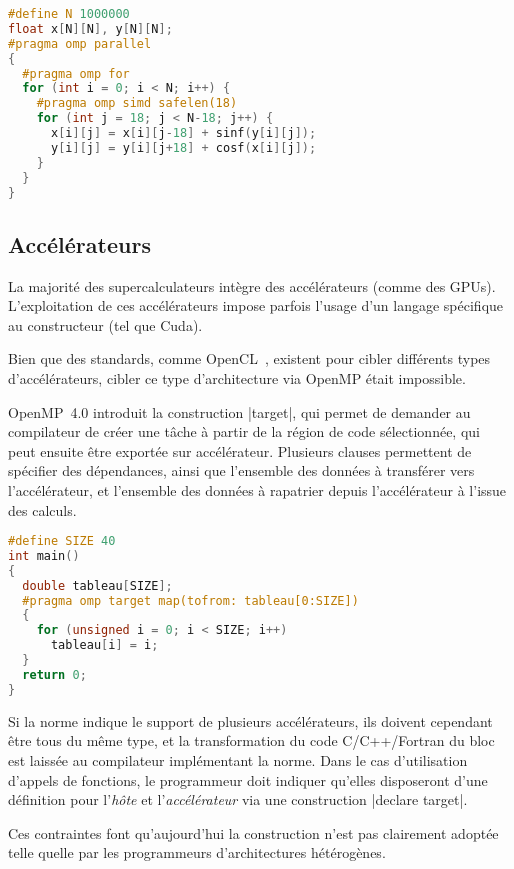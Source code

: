 \begin{lstlisting}[language=c++,caption=Vectorisation d'une opération complexe sur des tableaux,label=lst:context:openmp:simd]
#define N 1000000
float x[N][N], y[N][N];
#pragma omp parallel
{
  #pragma omp for
  for (int i = 0; i < N; i++) {
    #pragma omp simd safelen(18)
    for (int j = 18; j < N-18; j++) {
      x[i][j] = x[i][j-18] + sinf(y[i][j]);
      y[i][j] = y[i][j+18] + cosf(x[i][j]);
    }
  }
}
\end{lstlisting}



\subsection{Accélérateurs}

La majorité des supercalculateurs intègre des accélérateurs (comme des GPUs).
L'exploitation de ces accélérateurs impose parfois l'usage d'un langage spécifique au constructeur (tel que Cuda).

Bien que des standards, comme OpenCL~\cite{Stone2010}, existent pour cibler différents types d'accélérateurs, cibler ce type d'architecture via OpenMP était impossible.

OpenMP~4.0 introduit la construction |target|, qui permet de demander au compilateur de créer une tâche à partir de la région de code sélectionnée, qui peut ensuite être exportée sur accélérateur.
Plusieurs clauses permettent de spécifier des dépendances, ainsi que l'ensemble des données à transférer vers l'accélérateur, et l'ensemble des données à rapatrier depuis l'accélérateur à l'issue des calculs.

\begin{lstlisting}[language=c++,caption=Addition sur un accélérateur,label=lst:context:openmp:target]
#define SIZE 40
int main()
{
  double tableau[SIZE];
  #pragma omp target map(tofrom: tableau[0:SIZE])
  {
    for (unsigned i = 0; i < SIZE; i++)
      tableau[i] = i;
  }
  return 0;
}
\end{lstlisting}


Si la norme indique le support de plusieurs accélérateurs, ils doivent cependant être tous du même type, et la transformation du code C/C++/Fortran du bloc est laissée au compilateur implémentant la norme.
Dans le cas d'utilisation d'appels de fonctions, le programmeur doit indiquer qu'elles disposeront d'une définition pour l'\emph{hôte} et l'\emph{accélérateur} via une construction |declare target|.

Ces contraintes font qu'aujourd'hui la construction n'est pas clairement adoptée telle quelle par les programmeurs d'architectures hétérogènes.

